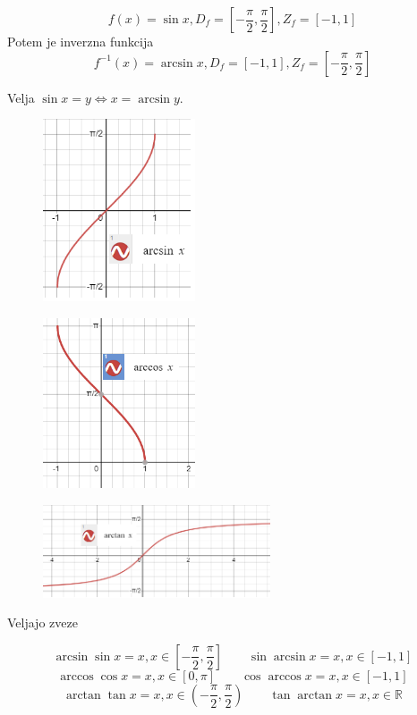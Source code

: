 \documentclass{article}
\begin{document}
\[f(x)=\sin x, D_f=[-\frac{\pi}{2},\frac{\pi}{2}], Z_f=[-1,1]\]
Potem je inverzna funkcija
\[f^{-1}(x)=\arcsin x, D_f=[-1,1], Z_f=[-\frac{\pi}{2},\frac{\pi}{2}]\]

Velja $\sin x=y \iff x=\arcsin y$.

\begin{figure}[H]
\includegraphics[width=0.4\textwidth]{trigonometrija.arcsin.png}
\centering
\end{figure}

\begin{figure}[H]
\includegraphics[width=0.4\textwidth]{trigonometrija.arccos.png}
\centering
\end{figure}

\begin{figure}[H]
\includegraphics[width=0.6\textwidth]{trigonometrija.arctan.png}
\centering
\end{figure}

Veljajo zveze

\[\arcsin\sin x=x, x\in[-\frac{\pi}{2},\frac{\pi}{2}] \qquad \sin\arcsin x=x, x\in[-1,1]\]
\[\arccos\cos x=x, x\in[0,\pi] \qquad \cos\arccos x=x, x\in[-1,1]\]
\[\arctan\tan x=x, x\in(-\frac{\pi}{2},\frac{\pi}{2}) \qquad \tan\arctan x=x,x\in\mathbb{R}\]
\end{document}
